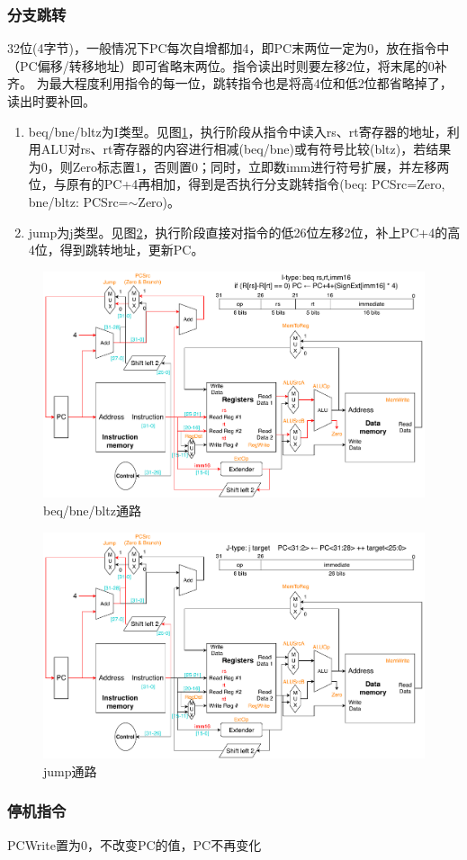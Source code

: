 \subsubsection{分支跳转}
32位(4字节)，一般情况下PC每次自增都加4，即PC末两位一定为0，放在指令中（PC偏移/转移地址）即可省略末两位。指令读出时则要左移2位，将末尾的0补齐。
为最大程度利用指令的每一位，跳转指令也是将高4位和低2位都省略掉了，读出时要补回。
\begin{enumerate}
	\item beq/bne/bltz为I类型。见图\ref{fig:datapath_beq}，执行阶段从指令中读入rs、rt寄存器的地址，利用ALU对rs、rt寄存器的内容进行相减(beq/bne)或有符号比较(bltz)，若结果为0，则Zero标志置1，否则置0；同时，立即数imm进行符号扩展，并左移两位，与原有的PC+4再相加，得到是否执行分支跳转指令(beq: PCSrc=Zero, bne/bltz: PCSrc=$\sim$Zero)。
	\item jump为j类型。见图\ref{fig:datapath_jump}，执行阶段直接对指令的低26位左移2位，补上PC+4的高4位，得到跳转地址，更新PC。
\end{enumerate}
\begin{figure}[htbp]
\centering
\includegraphics[width=\linewidth]{fig/Datapath_beq.pdf}
\caption{beq/bne/bltz通路}
\label{fig:datapath_beq}
\end{figure}
\begin{figure}[htbp]
\centering
\includegraphics[width=\linewidth]{fig/Datapath_jump.pdf}
\caption{jump通路}
\label{fig:datapath_jump}
\end{figure}

\subsubsection{停机指令}
\qquad PCWrite置为0，不改变PC的值，PC不再变化